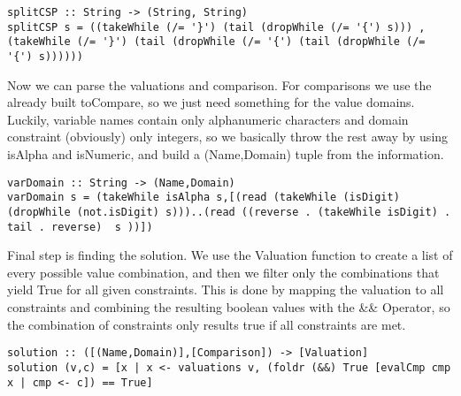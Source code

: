 \documentclass[a4paper,11pt]{article}
\begin{document}
\begin{lstlisting}
splitCSP :: String -> (String, String)
splitCSP s = ((takeWhile (/= '}') (tail (dropWhile (/= '{') s))) , (takeWhile (/= '}') (tail (dropWhile (/= '{') (tail (dropWhile (/= '{') s))))))
\end{lstlisting}
 
 Now we can parse the valuations and comparison. For comparisons we use the already built toCompare, so we just need something for the value domains. Luckily, variable names contain only alphanumeric characters and domain constraint (obviously) only integers, so we basically throw the rest away by using isAlpha and isNumeric, and build a (Name,Domain) tuple from the information.
 
\begin{lstlisting}
varDomain :: String -> (Name,Domain)
varDomain s = (takeWhile isAlpha s,[(read (takeWhile (isDigit) (dropWhile (not.isDigit) s)))..(read ((reverse . (takeWhile isDigit) . tail . reverse)  s ))])
\end{lstlisting}
 
 Final step is finding the solution. We use the Valuation function to create a list of every possible value combination, and then we filter only the combinations that yield True for all given constraints. This is done by mapping the valuation to all constraints and combining the resulting boolean values with the \&\& Operator, so the combination of constraints only results true if all constraints are met.

\begin{lstlisting}
solution :: ([(Name,Domain)],[Comparison]) -> [Valuation]
solution (v,c) = [x | x <- valuations v, (foldr (&&) True [evalCmp cmp x | cmp <- c]) == True]
\end{lstlisting}
\end{document}
